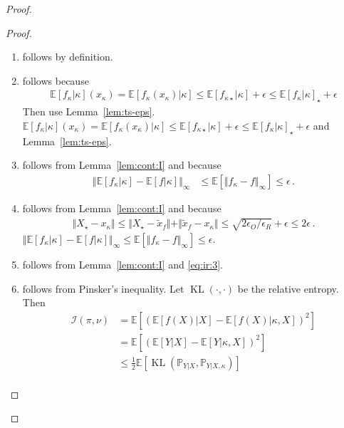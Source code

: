 \documentclass[letter, 12pt]{report}
\newcommand{\epsR}{{\epsilon_R}}
\newcommand{\epsO}{{\epsilon_O}}
\newcommand{\KL}{\operatorname{KL}}
\newcommand{\snorm}[1]{ \Vert  #1 \Vert}
\newcommand{\E}{\mathbb E}
\newcommand{\bbP}{\mathbb P}
\newcommand{\I}{\mathcal{I}}
\newcommand{\1}{\mathbf{1}}
\theoremstyle{plain}
\theoremstyle{definition}
\theoremstyle{remark}
\begin{document}
\begin{proof}
\begin{proof}
\begin{enumerate}
            \item follows by definition.
            \item follows because
                  \begin{align*}
                      \E[f_\kappa|\kappa](x_\kappa)
                      = \E[f_\kappa(x_\kappa)|\kappa]
                      \leq \E[f_{\kappa \star}|\kappa] + \epsilon
                      \leq \E[f_\kappa|\kappa]_\star + \epsilon
                  \end{align*}
                  Then use Lemma~\ref{lem:ts-eps}.
                  $\E[f_\kappa|\kappa](x_\kappa)
                      = \E[f_\kappa(x_\kappa)|\kappa]
                      \leq \E[f_{\kappa \star}|\kappa] + \epsilon
                      \leq \E[f_\kappa|\kappa]_\star + \epsilon$
                  and Lemma~\ref{lem:ts-eps}.
            \item follows from Lemma~\ref{lem:cont:I} and because
                  \begin{align*}
                      \snorm{\E[f_\kappa|\kappa] - \E[f|\kappa]}_\infty
                       & \leq \E[\snorm{f_\kappa - f}_\infty] \leq \epsilon \,.
                  \end{align*}
            \item follows from Lemma~\ref{lem:cont:I} and because
                  \begin{align*}
                      \snorm{X_\star - x_\kappa}
                      \leq \snorm{X_\star - \tilde x_f} + \snorm{\tilde x_f - x_\kappa}
                      \leq \sqrt{2\epsO / \epsR} + \epsilon
                      \leq 2\epsilon \,.
                  \end{align*}
                  $\snorm{\E[f_\kappa|\kappa] - \E[f|\kappa]}_\infty
                      \leq \E[\snorm{f_\kappa - f}_\infty] \leq \epsilon$.
            \item follows from Lemma~\ref{lem:cont:I} and \cref{eq:ir:3}.
            \item follows from Pinsker's inequality. Let $\KL(\cdot, \cdot)$ be the relative entropy. Then
                  \begin{align*}
                      \I(\pi, \nu)
                       & = \E[(\E[f(X)|X] - \E[f(X)|\kappa,X])^2]                 \\
                       & = \E[(\E[Y|X] - \E[Y|\kappa,X])^2]                       \\
                       & \leq \frac{1}{2} \E[ \KL(\bbP_{Y|X}, \bbP_{Y|X,\kappa})] \\

\end{align*}
\end{enumerate}
\end{proof}
\end{proof}
\end{document}
